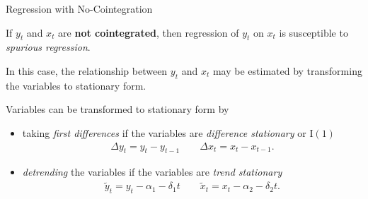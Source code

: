 \documentclass[10pt,aspectratio=169]{beamer}  %
\begin{document}
\begin{frame}{Regression with No-Cointegration}

    \bigskip
    If $ y_{t} $ and $ x_{t} $ are \textbf{not cointegrated}, then regression of $ y_{t} $ on $ x_{t} $ is susceptible to \textit{spurious regression}.

    \medskip
    In this case, the relationship between $ y_{t} $ and $ x_{t} $ may be estimated by transforming the variables to stationary form.

    \medskip
    Variables can be transformed to stationary form by
    \begin{itemize}\itemsep=1em
        \item taking \textit{first differences} if the variables are \textit{difference stationary} or $ \mathrm{I}(1) $
        \begin{align*}
            \Delta y_{t} = y_{t} - y_{t-1} \qquad \Delta x_{t} = x_{t} - x_{t-1}.
        \end{align*}
        \item \textit{detrending} the variables if the variables are \textit{trend stationary}
        \begin{align*}
            \widetilde{y}_{t} = y_{t} - \alpha_1 - \delta_1 t \qquad \widetilde{x}_{t} = x_{t} - \alpha_2 - \delta_2 t.
        \end{align*}
    \end{itemize}

\end{frame}

\end{document}

